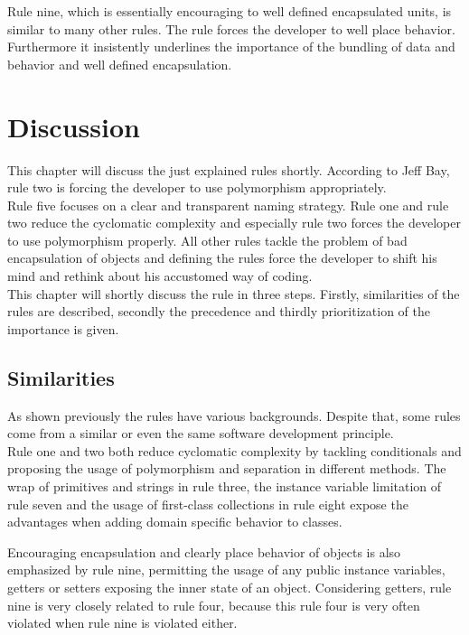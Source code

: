 Rule nine, which is essentially encouraging to well defined encapsulated units, is similar to many other rules. The rule forces the developer to well place behavior. Furthermore it insistently underlines the importance of the bundling of data and behavior and well defined encapsulation. 

\section{Discussion}
\label{d:discussion}
This chapter will discuss the just explained rules shortly. According to Jeff Bay, rule two is forcing the developer to use polymorphism appropriately. 
\\

Rule five focuses on a clear and transparent naming strategy. Rule one and rule two reduce the cyclomatic complexity and especially rule two forces the developer to use polymorphism properly. All other rules tackle the problem of bad encapsulation of objects and defining the rules force the developer to shift his mind and rethink about his accustomed way of coding. 
\\

This chapter will shortly discuss the rule in three steps. Firstly, similarities of the rules are described, secondly the precedence and thirdly prioritization of the importance is given.

\subsection*{Similarities}
As shown previously the rules have various backgrounds. Despite that, some rules come from a similar or even the same software development principle.
\\

Rule one and two both reduce cyclomatic complexity by tackling conditionals and proposing the usage of polymorphism and separation in different methods.
The wrap of primitives and strings in rule three, the instance variable limitation of rule seven and the usage of first-class collections in rule eight expose the advantages when adding domain specific behavior to classes. 

Encouraging encapsulation and clearly place behavior of objects is also emphasized by rule nine, permitting the usage of any public instance variables, getters or setters exposing the inner state of an object. Considering getters, rule nine is very closely related to rule four, because this rule four is very often violated when rule nine is violated either. 

